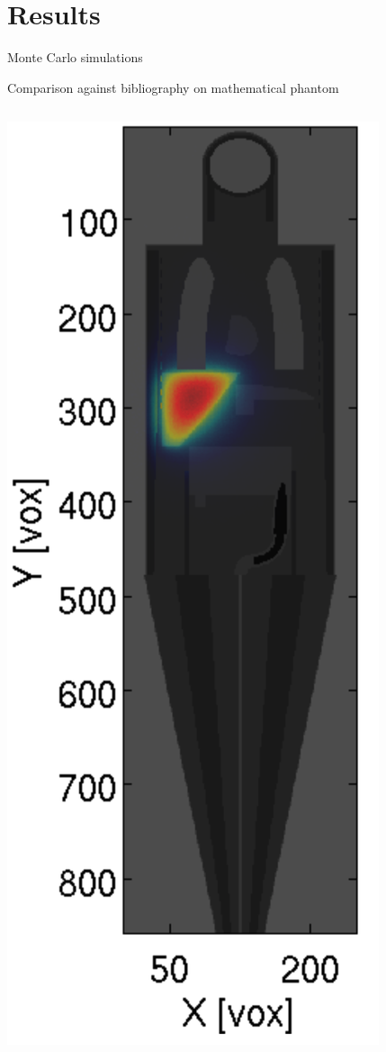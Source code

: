 \documentclass[ignorenonframetext,]{beamer}
\begin{document}
\hypertarget{results}{%
\section{Results}\label{results}}

\begin{frame}{Monte Carlo simulations}
\protect\hypertarget{monte-carlo-simulations}{}

Comparison against bibliography on mathematical phantom

\begin{columns}
\begin{column}{.3\textwidth}
\begin{center}
\includegraphics[height=.8\textheight]{imgs/mc_comparison.png}

\end{center}
\end{column}
\end{columns}
\end{frame}
\end{document}

